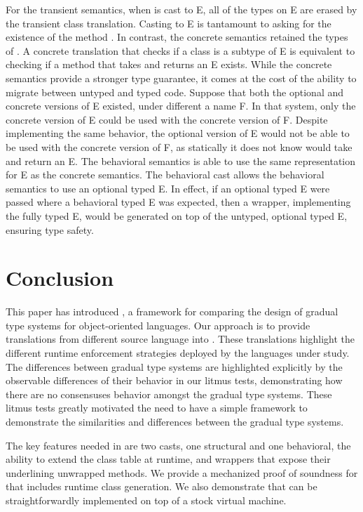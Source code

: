 \documentclass[a4paper,USenglish]{tex/lipics-v2016}
\begin{document}
For the transient semantics, when \x is cast to {\xt E}, all of the types on
{\xt E} are erased by the transient class translation. Casting to {\xt E} is
tantamount to asking for the existence of the method \m. In contrast, the
concrete semantics retained the types of \m. A concrete translation that
checks if a class is a subtype of {\xt E} is equivalent to checking if a
method \m that takes and returns an {\xt E} exists.  While the concrete
semantics provide a stronger type guarantee, it comes at the cost of the
ability to migrate between untyped and typed code. Suppose that both the
optional and concrete versions of {\xt E} existed, under different a name
{\xt F}. In that system, only the concrete version of {\xt E} could be used
with the concrete version of {\xt F}. Despite implementing the same
behavior, the optional version of {\xt E} would not be able to be used with
the concrete version of {\xt F}, as statically it does not know \m would
take and return an {\xt E}.  The behavioral semantics is able to use the
same representation for {\xt E} as the concrete semantics. The behavioral
cast allows the behavioral semantics to use an optional typed {\xt E}. In
effect, if an optional typed {\xt E} were passed where a behavioral typed
{\xt E} was expected, then a wrapper, implementing the fully typed {\xt E},
would be generated on top of the untyped, optional typed {\xt E}, ensuring
type safety.

\section{Conclusion}\label{litm}

This paper has introduced \kafka, a framework for comparing the design of
gradual type systems for object-oriented languages. Our approach is to
provide translations from different source language into \kafka. These
translations highlight the different runtime enforcement strategies deployed
by the languages under study. The differences between gradual type systems
are highlighted explicitly by the observable differences of their behavior in
our litmus tests, demonstrating how there are no consensuses behavior amongst the
gradual type systems. These litmus tests greatly motivated  the need to have
a simple framework to demonstrate the similarities and differences between
the gradual type systems.

The key features needed in \kafka are two casts, one structural and one
behavioral, the ability to extend the class table at runtime, and 
wrappers that expose their underlining unwrapped methods.  We provide a
mechanized proof of soundness for \kafka that includes runtime class
generation.  We also demonstrate that \kafka can be straightforwardly
implemented on top of a stock virtual machine.
\end{document}
